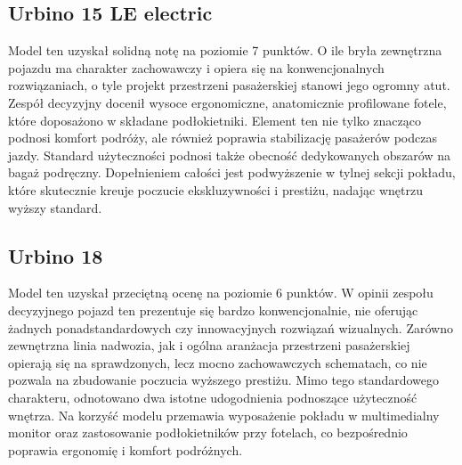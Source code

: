\subsection{Urbino 15 LE electric}
Model ten uzyskał solidną notę na poziomie 7 punktów. O ile bryła zewnętrzna pojazdu ma charakter zachowawczy i opiera się na konwencjonalnych rozwiązaniach, o tyle projekt przestrzeni pasażerskiej stanowi jego ogromny atut. Zespół decyzyjny docenił wysoce ergonomiczne, anatomicznie profilowane fotele, które doposażono w składane podłokietniki. Element ten nie tylko znacząco podnosi komfort podróży, ale również poprawia stabilizację pasażerów podczas jazdy. Standard użyteczności podnosi także obecność dedykowanych obszarów na bagaż podręczny. Dopełnieniem całości jest podwyższenie w tylnej sekcji pokładu, które skutecznie kreuje poczucie ekskluzywności i prestiżu, nadając wnętrzu wyższy standard.

\subsection{Urbino 18}
Model ten uzyskał przeciętną ocenę na poziomie 6 punktów. W opinii zespołu decyzyjnego pojazd ten prezentuje się bardzo konwencjonalnie, nie oferując żadnych ponadstandardowych czy innowacyjnych rozwiązań wizualnych. Zarówno zewnętrzna linia nadwozia, jak i ogólna aranżacja przestrzeni pasażerskiej opierają się na sprawdzonych, lecz mocno zachowawczych schematach, co nie pozwala na zbudowanie poczucia wyższego prestiżu. Mimo tego standardowego charakteru, odnotowano dwa istotne udogodnienia podnoszące użyteczność wnętrza. Na korzyść modelu przemawia wyposażenie pokładu w multimedialny monitor oraz zastosowanie podłokietników przy fotelach, co bezpośrednio poprawia ergonomię i komfort podróżnych.

